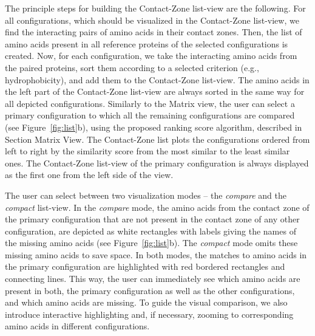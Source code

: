 \documentclass{bmcart}
\def\MatView {Matrix view\xspace}
\def\CoZoListView {Contact-Zone list-view\xspace}
\def\CoZoList{Contact-Zone list\xspace}
\begin{document}
The principle steps for building the \CoZoListView are the following.
For all configurations, which should be visualized in the \CoZoListView, we find the interacting pairs of amino acids in their contact zones.
Then, the list of amino acids present in all reference proteins of the selected configurations is created.
Now, for each configuration, we take the interacting amino acids from the paired proteins, sort them according to a selected criterion (e.g., hydrophobicity), and add them to the \CoZoListView.
The amino acids in the left part of the \CoZoListView are always sorted in the same way for all depicted configurations.
Similarly to the \MatView, the user can select a primary configuration to which all the remaining configurations are compared (see Figure~\ref{fig:list}b), using the proposed ranking score algorithm, described in Section Matrix View.
The \CoZoList plots the configurations ordered from left to right by the similarity score from the most similar to the least similar ones.
The \CoZoListView of the primary configuration is always displayed as the first one from the left side of the view.

The user can select between two visualization modes -- the \textit{compare} and the \textit{compact} list-view.
In the \textit{compare} mode, the amino acids from the contact zone of the primary configuration that are not present in the contact zone of any other configuration, are depicted as white rectangles with labels giving the names of the missing amino acids (see Figure~\ref{fig:list}b).
The \textit{compact} mode omits these missing amino acids to save space.
In both modes, the matches to amino acids in the primary configuration are highlighted with red bordered rectangles and connecting lines.
This way, the user can immediately see which amino acids are present in both, the primary configuration as well as the other configurations, and which amino acids are missing.
To guide the visual comparison, we also introduce interactive highlighting and, if necessary, zooming to corresponding amino acids in different configurations.

\end{document}
